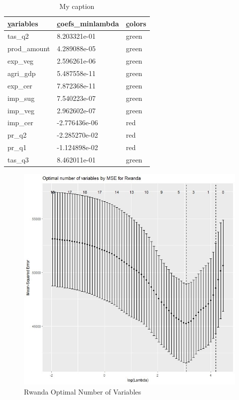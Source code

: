 \documentclass[12pt,a4paper,english]{article}
\begin{document}
\FloatBarrier
\begin{table}[!htbp]
\label{my-label}
\begin{tabular}{lll}
\hline
{\ul variables}        & {\ul coefs\_minlambda} & {\ul colors} \\ \hline
tas\_q2                & 8.203321e-01           & green        \\
prod\_amount           & 4.289088e-05           & green        \\
exp\_veg               & 2.596261e-06           & green        \\
agri\_gdp              & 5.487558e-11           & green        \\
exp\_cer               & 7.872368e-11           & green        \\
imp\_sug               & 7.540223e-07           & green        \\
imp\_veg               & 2.962602e-07           & green        \\
imp\_cer               & -2.776436e-06          & red          \\
pr\_q2                 & -2.285270e-02          & red          \\
pr\_q1                 & -1.124898e-02          & red          \\
tas\_q3                & 8.462011e-01           & green       \\ \hline
\end{tabular}
\centering
\caption{My caption}
\end{table}
\FloatBarrier


\FloatBarrier
\begin{figure}[!htb]
\begin{center}
\includegraphics[scale=0.50]{L2.jpg}
\caption{Rwanda Optimal Number of Variables}
\label{figure10}
\end{center}
\end{figure}
\FloatBarrier
\end{document}
